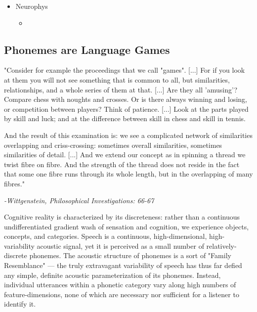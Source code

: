 \begin{multicols}{2}
\begin{itemize}
	\item Neurophys
	\begin{itemize}
		\item 
	\end{itemize}

\end{itemize}


\subsection{Phonemes are Language Games}

\begin{leftbar}

"Consider for example the proceedings that we call "games". [...] For if you look at them you will not see something that is common to all, but similarities, relationships, and a whole series of them at that. [...] Are they all 'amusing'? Compare chess with noughts and crosses. Or is there always winning and losing, or competition between players? Think of patience. [...] Look at the parts played by skill and luck; and at the difference between skill in chess and skill in tennis. 

And the result of this examination is: we see a complicated network
of similarities overlapping and criss-crossing: sometimes overall similarities, sometimes similarities of detail. [...] And we extend our concept as in spinning a thread we twist fibre on fibre. And the strength of the thread does not reside in the fact that some one fibre runs through its whole length, but in the overlapping of many fibres."

\textit{-Wittgenstein, Philosophical Investigations: 66-67\cite{wittgensteinPhilosophicalInvestigations1968}}

\end{leftbar}

Cognitive reality is characterized by its discreteness: rather than a continuous undifferentiated gradient wash of sensation and cognition, we experience objects, concepts, and categories. Speech is a continuous, high-dimensional, high-variability acoustic signal, yet it is perceived as a small number of relatively-discrete phonemes\cite{holtSpeechPerceptionCategorization2010a}. The acoustic structure of phonemes is a sort of "Family Resemblance"\cite{wittgensteinPhilosophicalInvestigations1968} --- the truly extravagant variability of speech has thus far defied any simple, definite acoustic parameterization of its phonemes. Instead, individual utterances within a phonetic category vary along high numbers of feature-dimensions, none of which are necessary nor sufficient for a listener to identify it\cite{Lisker1977}.


\end{multicols}
